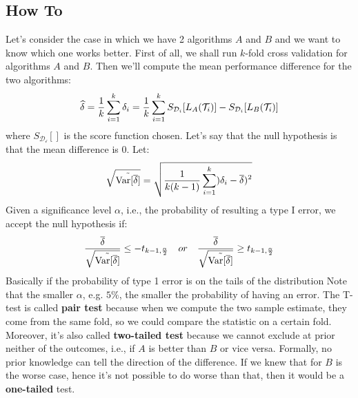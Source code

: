 \subsection{How To}
Let's consider the case in which we have 2 algorithms $A$ and $B$ and we want to know which one works better. \newline
First of all, we shall run $k$-fold cross validation for algorithms $A$ and $B$. Then we'll compute the mean performance difference for the two algorithms:
\[\widehat{\delta}=\frac{1}{k}\displaystyle\sum_{i=1}^k\delta_i=\frac{1}{k}\displaystyle\sum_{i=1}^kS_{\mathcal{D}_i}[L_A(\mathcal{T}_i)]-S_{\mathcal{D}_i}[L_B(\mathcal{T}_i)]\]
where $S_{\mathcal{D_i}}[]$ is the score function chosen. \newline
Let's say that the null hypothesis is that the mean difference is 0. \newline
Let:
\[\sqrt{\tilde{\text{Var}[\overline{\delta}]}}=\sqrt{\frac{1}{k(k-1)}\displaystyle\sum_{i=1}^k)\delta_i-\overline{\delta})^2}\]
Given a significance level $\alpha$, i.e., the probability of resulting a type I error, we accept the null hypothesis if:
\[\frac{\overline{\delta}}{\sqrt{\tilde{\text{Var}[\overline{\delta}]}}}\leq -t_{k-1,\frac{\alpha}{2}}\quad or\quad \frac{\overline{\delta}}{\sqrt{\tilde{\text{Var}[\overline{\delta}]}}}\geq t_{k-1,\frac{\alpha}{2}}\]
Basically if the probability of type 1 error is on the tails of the distribution \newline
Note that the smaller $\alpha$, e.g. $5\%$, the smaller the probability of having an error. \newline
The T-test is called \textbf{pair test} because when we compute the two sample estimate, they come from the same fold, so we could compare the statistic on a certain fold. Moreover, it's also called \textbf{two-tailed test} because we cannot exclude at prior neither of the outcomes, i.e., if $A$ is better than $B$ or vice versa. Formally, no prior knowledge can tell the direction of the difference. If we knew that for $B$ is the worse case, hence it's not possible to do worse than that, then it would be a \textbf{one-tailed} test.
%
%
